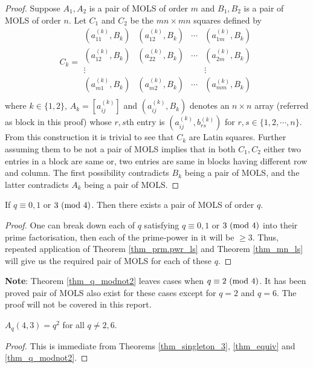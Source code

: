 \documentclass[../main.tex]{subfiles}
\begin{document}
\begin{proof}
	Suppose $A_1,A_2$ is a pair of MOLS of order $m$ and $B_1,B_2$ is a pair of MOLS of order $n$.
	Let $C_1$ and $C_2$ be the $mn\times mn$ squares defined by
	\[
		C_k = 
		\begin{array}{cccc}
			(a_{11}^{(k)},B_k) & (a_{12}^{(k)},B_k) & \cdots & (a_{1m}^{(k)},B_k)\\
			(a_{12}^{(k)},B_k) & (a_{22}^{(k)},B_k) & \cdots & (a_{2m}^{(k)},B_k)\\
			\vdots & & & \vdots \\
			(a_{m1}^{(k)},B_k) & (a_{m2}^{(k)},B_k) & \cdots & (a_{mm}^{(k)},B_k)\\
		\end{array}
	\]
	where $k\in \{1,2\}$, $A_k = [a_{ij}^{(k)}]$ and $(a_{ij}^{(k)},B_k)$ denotes an $n\times n$ array (referred as block in this proof) whose $r,s$th entry is $(a_{ij}^{(k)},b_{rs}^{(k)})$ for $r,s \in \{1,2,\cdots,n\}$. \\
	From this construction it is trivial to see that $C_k$ are Latin squares. Further assuming them to be not a pair of MOLS implies that in both $C_1,C_2$ either two entries in a block are same or, two entries are same in blocks having different row and column. The first possibility contradicts $B_k$ being a pair of MOLS, and the latter contradicts $A_k$ being a pair of MOLS.
\end{proof}

\begin{thm}\label{thm_q_modnot2}
	If $q\equiv 0, 1$ or $3\ (\mathrm{mod}\ 4)$. Then there exists a pair of MOLS of order $q$.
\end{thm}

\begin{proof}
	One can break down each of $q$ satisfying $q\equiv 0, 1$ or $3\ (\mathrm{mod}\ 4)$ into their prime factorisation, then each of the prime-power in it will be $\geq 3$. Thus, repeated application of Theorem \ref{thm_prm.pwr_ls} and Theorem \ref{thm_mn_ls} will give us the required pair of MOLS for each of these $q$.  
\end{proof}

\textbf{Note}: Theorem \ref{thm_q_modnot2} leaves cases when $q\equiv 2\ (\mathrm{mod}\ 4)$. It has been proved pair of MOLS also exist for these cases except for $q=2$ and $q=6$. The proof will not be covered in this report. 

\begin{cor}
	$A_q(4,3)=q^2$ for all $q\neq 2,6$.
\end{cor}
\begin{proof}
	This is immediate from Theorems \ref{thm_singleton_3}, \ref{thm_equiv} and \ref{thm_q_modnot2}.
\end{proof}
\end{document}
